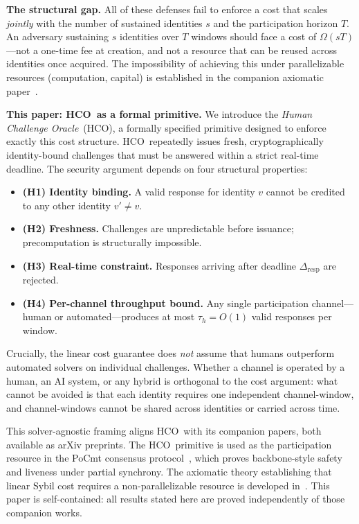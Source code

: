 \documentclass[11pt]{article}
\newcommand{\HCO}{HCO\xspace}
\theoremstyle{remark}
\theoremstyle{plain}
\begin{document}
	\noindent\textbf{The structural gap.}
	All of these defenses fail to enforce a cost that scales
	\emph{jointly} with the number of sustained identities $s$ and the
	participation horizon $T$. An adversary sustaining $s$ identities over
	$T$ windows should face a cost of $\Omega(sT)$---not a one-time fee at
	creation, and not a resource that can be reused across identities once
	acquired. The impossibility of achieving this under parallelizable
	resources (computation, capital) is established in the companion
	axiomatic paper~\cite{maleki2026geometry}.
	
	\noindent\textbf{This paper: \HCO\ as a formal primitive.}
	We introduce the \emph{Human Challenge Oracle}~(\HCO), a formally
	specified primitive designed to enforce exactly this cost structure.
	\HCO\ repeatedly issues fresh, cryptographically identity-bound
	challenges that must be answered within a strict real-time deadline.
	The security argument depends on four structural properties:
	
	\begin{itemize}
		\item \textbf{(H1) Identity binding.} A valid response for identity
		$v$ cannot be credited to any other identity $v' \neq v$.
		\item \textbf{(H2) Freshness.} Challenges are unpredictable before
		issuance; precomputation is structurally impossible.
		\item \textbf{(H3) Real-time constraint.} Responses arriving after
		deadline $\Delta_{\mathrm{resp}}$ are rejected.
		\item \textbf{(H4) Per-channel throughput bound.} Any single
		participation channel---human or automated---produces at most
		$\tau_h = O(1)$ valid responses per window.
	\end{itemize}
	
	Crucially, the linear cost guarantee does \emph{not} assume that
	humans outperform automated solvers on individual challenges.
	Whether a channel is operated by a human, an AI system, or any hybrid
	is orthogonal to the cost argument: what cannot be avoided is that each
	identity requires one independent channel-window, and channel-windows
	cannot be shared across identities or carried across time.
	
	This solver-agnostic framing aligns \HCO\ with its companion papers,
	both available as arXiv preprints.
	The \HCO\ primitive is used as the participation resource in the
	PoCmt consensus protocol~\cite{maleki2026pocmt}, which proves
	backbone-style safety and liveness under partial synchrony. The
	axiomatic theory establishing that linear Sybil cost requires a
	non-parallelizable resource is developed in~\cite{maleki2026geometry}.
	This paper is self-contained: all results stated here are proved
	independently of those companion works.
	
\end{document}
